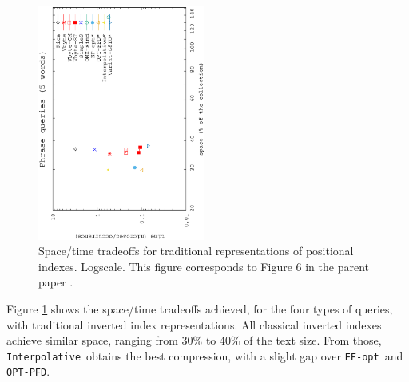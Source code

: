 \documentclass[review]{elsarticle}
\newcommand{\vbyte}{\texttt{Vbyte}}
\newcommand{\rice}{\texttt{Rice}}
\newcommand{\simplen}{\texttt{Simple9}}
\newcommand{\qmx}{\texttt{QMX}}
\newcommand{\vbyteST}{\texttt{Vbyte-ST}}
\newcommand{\interpolative}{\texttt{Interpolative}}
\newcommand{\efopt}{\texttt{EF-opt}}
\newcommand{\optpfd}{\texttt{OPT-PFD}}
\newcommand{\varint}{\texttt{varintG8IU}}
\begin{document}
\begin{figure}[t]
\begin{center}
\includegraphics[angle=-90,width=0.49\textwidth]{../figures/f3/phrases5-5/locate-5_5.eps}
\caption{Space/time tradeoffs for traditional representations of positional indexes. Logscale. This figure corresponds to Figure 6 in the parent paper \cite{CFMNis16.3}.}
\label{fig:pos}
\end{center}
\end{figure}

Figure \ref{fig:pos} shows the space/time tradeoffs achieved, for the four
types of queries, with traditional inverted index representations.
All classical inverted indexes achieve similar space, ranging from 30\% to 40\% of the text size. From those, \interpolative\ obtains the best compression, with a slight gap over \efopt\ and \optpfd. 

% 
% 
\end{document}
